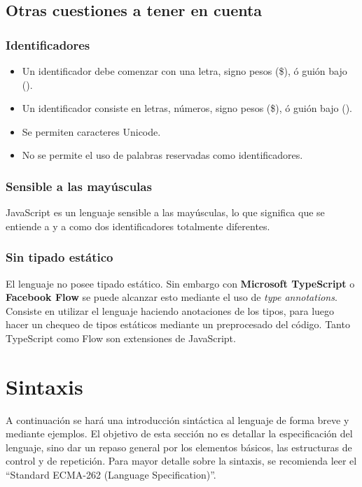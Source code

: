 \subsection{Otras cuestiones a tener en cuenta}

\subsubsection{Identificadores}

\begin{itemize}
\item Un identificador debe comenzar con una letra, signo pesos (\$), ó guión bajo (\textunderscore).
\item Un identificador consiste en letras, números, signo pesos (\$), ó guión bajo (\textunderscore).
\item Se permiten caracteres Unicode.
\item No se permite el uso de palabras reservadas como identificadores.
\end{itemize}

\subsubsection{Sensible a las mayúsculas}

JavaScript es un lenguaje sensible a las mayúsculas, lo que significa que se entiende a  y a  como dos identificadores totalmente diferentes.

\subsubsection{Sin tipado estático}

El lenguaje no posee tipado estático. Sin embargo con \textbf{Microsoft TypeScript} o \textbf{Facebook Flow} se puede alcanzar esto mediante el uso de \textit{type annotations}. Consiste en utilizar el lenguaje haciendo anotaciones de los tipos, para luego hacer un chequeo de tipos estáticos mediante un preprocesado del código. Tanto TypeScript como Flow son extensiones de JavaScript. 

\section{Sintaxis}

A continuación se hará una introducción sintáctica al lenguaje de forma breve y mediante ejemplos. El objetivo de esta sección no es detallar la especificación del lenguaje, sino dar un repaso general por los elementos básicos, las estructuras de control y de repetición. Para mayor detalle sobre la sintaxis, se recomienda leer el "`Standard ECMA-262 (Language Specification)"'.

